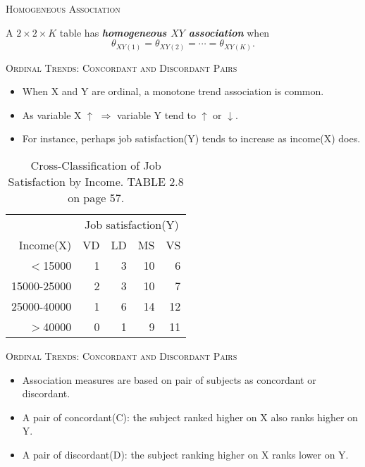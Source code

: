 \documentclass[dvipdfmx, serif,handout]{beamer}
\begin{document}
\begin{frame}{\textsc{Homogeneous Association}}

	\bi
	\item A $2 \times 2 \times K$ table has {\bf{\em homogeneous $XY$ association}} when
	$$\theta_{XY(1)} = \theta_{XY(2)} = \cdots =\theta_{XY(K)}.$$
	\ei

\end{frame}
\begin{frame}{\textsc{Ordinal Trends: Concordant and Discordant Pairs}}

	\begin{itemize}
		\item When X and Y are ordinal, a monotone trend association is common.
		\item As variable X $\uparrow$ $\Rightarrow$ variable Y tend to $\uparrow$ or $\downarrow$.
		\item For instance, perhaps job satisfaction(Y) tends to increase as income(X) does.
	\end{itemize}

	{\scriptsize
	\begin{table} %
		\begin{tabular}{rrrrr}
			\hline
			            & \multicolumn{4}{c}{Job satisfaction(Y)}                \\
			Income(X)   & VD                                      & LD & MS & VS \\
			\hline
			$<$15000    & 1                                       & 3  & 10 & 6  \\
			15000-25000 & 2                                       & 3  & 10 & 7  \\
			25000-40000 & 1                                       & 6  & 14 & 12 \\
			$>$40000    & 0                                       & 1  & 9  & 11 \\
			\hline
		\end{tabular}
		\caption{\scriptsize Cross-Classification of Job Satisfaction by Income. TABLE 2.8 on page 57.}
	\end{table}
	}

\end{frame}
\begin{frame}{\textsc{Ordinal Trends: Concordant and Discordant Pairs}}

	\begin{itemize}
		\item Association  measures are based on pair of subjects as concordant or discordant.
		\item A pair of concordant(C): the subject ranked higher on X also ranks higher on Y.

		\item A pair of discordant(D): the subject ranking higher on X ranks lower on Y.


	\end{itemize}

\end{frame}
\end{document}
